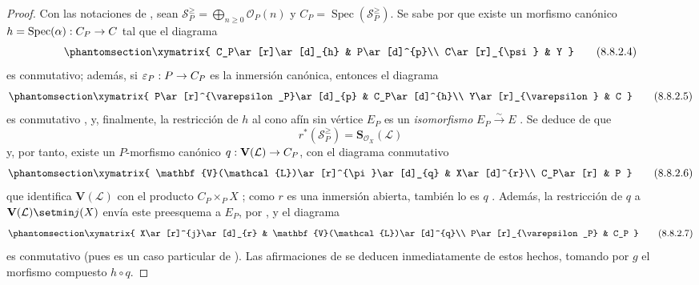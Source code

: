 \documentclass[oneside,10pt]{amsart}
\makeatletter
\newcommand{\ega@arrow}[2]{\mathchoice{#1}{#2}{#2}{#2}}
\renewcommand{\to}{\ega@arrow{\longrightarrow}{\rightarrow}}
\newcommand{\oldpage}[2][]{\marginnote{\normalfont\footnotesize\textbf{#1}~|~#2}\ignorespaces}
\let\EGAOriginalLabel\label
\renewcommand{\label}[1]{\phantomsection\EGAOriginalLabel{#1}}
\newcommand*{\ega@labelnumber}[1]{\StrBehind{#1}{.}}
\newcommand{\eref}[1]{\hyperref[#1]{\normalfont{(\ega@labelnumber{#1})}}}
\makeatother
\begin{document}
\begin{proof}
Con las notaciones de , sean $\mathcal{S}_P^{\geqslant}=\bigoplus_{n\geqslant 0}\mathcal{O}_P(n)$ y $C_P=\operatorname{Spec}(\mathcal{S}_P^{\geqslant})$.
Se sabe por  que existe un morfismo canónico $h=\operatorname{Spec}(\alpha):C_P\to C$ tal que el diagrama
\begin{equation}
\label{II.8.8.2.4-fr}
  \xymatrix{
    C_P\ar[r]\ar[d]_{h} & P\ar[d]^{p}\\
    C\ar[r]_{\psi} & Y
  }
\tag{8.8.2.4}
\end{equation}
es conmutativo; además, si $\varepsilon_P:P\to C_P$ es la inmersión canónica, entonces el diagrama
\begin{equation}
\label{II.8.8.2.5-fr}
  \xymatrix{
    P\ar[r]^{\varepsilon_P}\ar[d]_{p} & C_P\ar[d]^{h}\\
    Y\ar[r]_{\varepsilon} & C
  }
\tag{8.8.2.5}
\end{equation}
es conmutativo , y, finalmente, la restricción de $h$ al cono afín sin vértice $E_P$ es un \emph{isomorfismo} $E_P\xrightarrow{\sim}E$ .
Se deduce de  que
\[
  r^*(\mathcal{S}_P^{\geqslant})=
  \mathbf{S}_{\mathcal{O}_X}(\mathcal{L})
\]
\oldpage[II]{179}
y, por tanto, existe un $P$-morfismo canónico $q:\mathbf{V}(\mathcal{L})\to C_P$, con el diagrama conmutativo
\begin{equation}
\label{II.8.8.2.6-fr}
  \xymatrix{
    \mathbf{V}(\mathcal{L})\ar[r]^{\pi}\ar[d]_{q} & X\ar[d]^{r}\\
    C_P\ar[r] & P
  }
\tag{8.8.2.6}
\end{equation}
que identifica $\mathbf{V}(\mathcal{L})$ con el producto $C_P\times_P X$ ;
como $r$ es una inmersión abierta, también lo es $q$ .
Además, la restricción de $q$ a $\mathbf{V}(\mathcal{L})\setmin j(X)$ envía este preesquema a $E_P$, por , y el diagrama
\begin{equation}
\label{II.8.8.2.7-fr}
  \xymatrix{
    X\ar[r]^{j}\ar[d]_{r} & \mathbf{V}(\mathcal{L})\ar[d]^{q}\\
    P\ar[r]_{\varepsilon_P} & C_P
  }
\tag{8.8.2.7}
\end{equation}
es conmutativo (pues es un caso particular de \eref{II.8.5.1.3-fr}).
Las afirmaciones de  se deducen inmediatamente de estos hechos, tomando por $g$ el morfismo compuesto $h\circ q$.
\end{proof}
\end{document}
